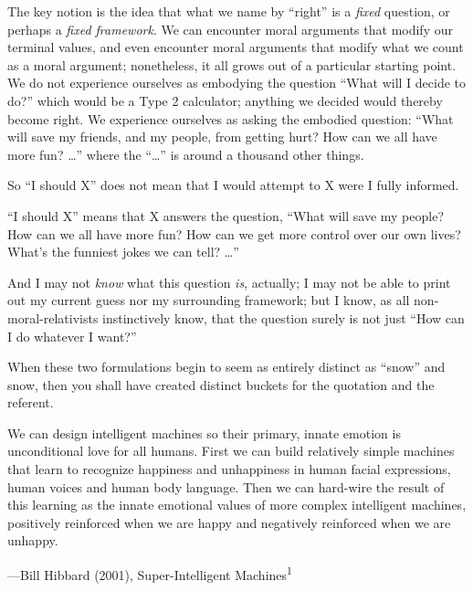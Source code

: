 {
 The key notion is the idea that what we name by
``right'' is a \textit{fixed}
question, or perhaps a \textit{fixed framework}. We can encounter moral
arguments that modify our terminal values, and even encounter moral
arguments that modify what we count as a moral argument; nonetheless,
it all grows out of a particular starting point. We do not experience
ourselves as embodying the question ``What will I
decide to do?'' which would be a Type 2 calculator;
anything we decided would thereby become right. We experience ourselves
as asking the embodied question: ``What will save my
friends, and my people, from getting hurt? How can we all have more
fun? \ldots'' where the
``\ldots'' is around a thousand other
things.}

{
 So ``I should X'' does not mean
that I would attempt to X were I fully informed.}

{
 ``I should X'' means that X
answers the question, ``What will save my people? How
can we all have more fun? How can we get more control over our own
lives? What's the funniest jokes we can tell?
\ldots''}

{
 And I may not \textit{know} what this question \textit{is},
actually; I may not be able to print out my current guess nor my
surrounding framework; but I know, as all non-moral-relativists
instinctively know, that the question surely is not just
``How can I do whatever I want?''}

{
 When these two formulations begin to seem as entirely distinct as
``snow'' and snow, then you shall
have created distinct buckets for the quotation and the referent.}

\myendsectiontext


{
 We can design intelligent machines so their primary, innate
emotion is unconditional love for all humans. First we can build
relatively simple machines that learn to recognize happiness and
unhappiness in human facial expressions, human voices and human body
language. Then we can hard-wire the result of this learning as the
innate emotional values of more complex intelligent machines,
positively reinforced when we are happy and negatively reinforced when
we are unhappy.}

{\raggedleft
 {}---Bill Hibbard (2001), Super-Intelligent
Machines\textsuperscript{1}
\par}


\bigskip

{
 ~}

